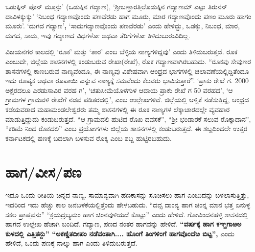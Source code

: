 ಒಡುಕ್ಕಿನ್​ ಪೊನ್​ ಮೂನ್ರು’ (ಒಡುಕ್ಕಿನ ಗದ್ಯಾಣ), ‘ಶ‍್ರೀಬಣ್ಡಾರತ್ತಿಲೊಡುಕ್ಕಿನ ಗದ್ಯಾಣಮ್ ಎಟ್ಟು ತಿರುನನ್​ದಾವಿಳಕ್ಕುಕ್ಕು’  ‘ನಿಬಂಧ ಗದ್ಯಾಣವೊಂದು ಪಣವೆರಡು ಹಾಗ ಮೂರು, ಮಾರ ಗದ್ಯಾಣವೊಂದು ಪಣಂ ಮೂರು ಹಾಗಂ ಮೂರು’. ‘ದುಗದ ಗದ್ಯಾಣ’\textbf{,} ‘ಸಾದುಗದ್ಯಾಣವೊಂದು ಪಣವೆರಡು’ ಎಂದು ಹೇಳಿದ್ದು, ಒಡಕ್ಕು, ನಿಬಂಧ, ಮಾರ, ದುಗದ, ಸಾದು, ಇವು ಗದ್ಯಾಣದ ವಿಧಗಳೋ ಅಥವಾ ತೆರಿಗೆಗಳೋ ತಿಳಿದುಬುರುವಿದಿಲ್ಲ.

ವಿಜಯನಗರ ಕಾಲದಲ್ಲಿ ‘ರೂಕ’ ಮತ್ತು ‘ತಾರ’ ಎಂಬ ಬೆಳ್ಳಿಯ ನಾಣ್ಯಗಳಿದ್ದವು’ ಎಂದು ತಿಳಿದುಬರುತ್ತದೆ. ರೂಕ ಎಂಬುದೇ, ಜಿಲ್ಲೆಯ ಶಾಸನಗಳಲ್ಲಿ ಕಂಡುಬರುವ ರೇಖಾ(ರೇಖೆ), ರೊಕ ಗದ್ಯಾಣವಾಗಿರಬಹುದು. “ರೂಕವು ಸೇವುಣರ ಶಾಸನಗಳಲ್ಲಿ ಕಾಣಬರುವ ನಾಣ್ಯವೆಂದೂ, ಈ ನಾಣ್ಯವು ವಿಶೇಷವಾಗಿ ಆಂಧ್ರದ ಭಾಗಗಳಲ್ಲಿ ಚಲಾವಣೆಯಲ್ಲಿದ್ದಿತೆಂದೂ ಇದು ರೂಪ್ಯಕ ಅಥವಾ ರೂಪಾಯಿ ಎನ್ನುವ ನಾಣ್ಯಕ್ಕೆ ಸಮವೆಂದು ಕೆಲವರು ಭಾವಿಸುತ್ತಾರೆ”. ‘ಪ್ರಾಕು ರೇಖೆ ಗ. 2000 ಅಕ್ಷರದಲೂ ಎರಡುಸಾವಿರ ವರಹ ಗ’, ‘ಚತುಸೀಮೆಯೊಳಗುಳ ಆದಾಯ ಪ್ರಾಕು ರೇಖೆ ಗ 50 ವರಹದ’, ‘ಆ ಗ್ರಾಮಗಳ ಗ್ರಾಮವಳಿ ರೇಖೆಗೆ ನಡವ ಪಡಿತರದಲ್ಲಿ’, ಎಂಬ ಉಲ್ಲೇಖಗಳಿವೆ. ಜಿಲ್ಲೆಯಲ್ಲಿ ಆಳ್ವಿಕೆ ನಡೆಸುತ್ತಿದ್ದ, ಆಂಧ್ರದ ಕಡೆಯವರಾದ ಮಹಾಮಂಡಲೇಶ್ವರರು ತಮ್ಮ ಶಾಸನಗಳಲ್ಲಿ ಈ ರೂಕ ನಾಣ್ಯಗಳ ಲೆಕ್ಕಾಚಾರದಲ್ಲೇ ವ್ಯವಹಾರ ಮಾಡುತ್ತಿದ್ದುದು ಕಂಡುಬರುತ್ತದೆ. “ಆ ಗ್ರಾಮದಲಿ ಹುಟಿದ ರೊಖ ದವಸಕೆ”, “ಶ‍್ರೀ ಭಂಡಾರಕೆ ಸಲುವ ರೊಕ್ಕಾದಾನ”, “ಕಡಿಮೆ ನಿಂದ ರೊಕದಲಿ” ಎಂಬ ಪ್ರಯೋಗಗಳು ಜಿಲ್ಲೆಯ ಶಾಸನಗಳಲ್ಲಿ ಕಂಡುಬರುತ್ತದೆ. ಈ ಶಬ್ದದಿಂದಲೇ ಉತ್ತರ ಕರ್ನಾಟಕದಲ್ಲಿ ಹಣಕ್ಕೆ ಬದಲಾಗಿ ಬಳಸುವ ರೊಕ್ಕ ಎಂಬ ಶಬ್ದ ಹುಟ್ಟಿರಬಹುದು.


\section{ಹಾಗ/ವೀಸ/ಪಣ}

ಇದೂ ಒಂದು ರೀತಿಯ ಚಿನ್ನದ ನಾಣ್ಯ. ಸಾಮಾನ್ಯವಾಗಿ ಹಣಕಾಸನ್ನು ಸೂಚಿಸಲು ಹಾಗ ಎಂಬುದನ್ನು ಬಳಲಾಸುತ್ತಿತ್ತು, ಇದರಿಂದ ಇದು ಹೆಚ್ಚು ಕಾಲ ಜನಬಳಕೆಯಲ್ಲಿತ್ತೆಂದು ಹೇಳಬಹುದು. “ದವ್ಸ ದಾಂನ್ಯ ಹಾಗ ಚಿಂನ್ನ ಮಾನ ಭತ್ತ ಏನುಳ್ಳ ಸಕಲ ಪ್ರಾಪ್ತವನು” “ಕ್ರಯದ್ರಬ್ಯಮಂ ಹಾಗ ಚಿಂನವುಳಿಯದೆ ಕೊಟ್ಟು” ಎಂದು ಹೇಳಿದೆ. ಗೋವಿಂದನಹಳ್ಳಿ ಶಾಸನದಲ್ಲಿ ಹಾಗದ ಉಲ್ಲೇಖ ಹೆಚಾಗಿ ಬಂದಿದೆ. ಗದ್ಯಾಣ, ಪಣದ ನಂತರ ಹಾಗವನ್ನು ಹೇಳಿದೆ. \textbf{“ವರ್ಷಕ್ಕೆ ಹಾಗ ಕಞ್ಚಗಾಱಅ ಕುಳದಲ್ಲಿ ಎತ್ತಿತನ್ದು” “ಅಕಣ್ಡಿತದೀಪಂ ನಡೆವಂತಾಗಿ.... ಹೊಂಗೆ ತಿಂಗಳಿಂಗೆ ಹಾಗವೊಂದೆಱ ಬಿಟ್ಟ”, }ಎಂದು ಹೇಳಿದೆ, ಒಂದು ಪಣಕ್ಕೆ ನಾಲ್ಕು ಹಾಗ ಎಂದು ತಿಳಿದುಬರುತ್ತದೆ.

